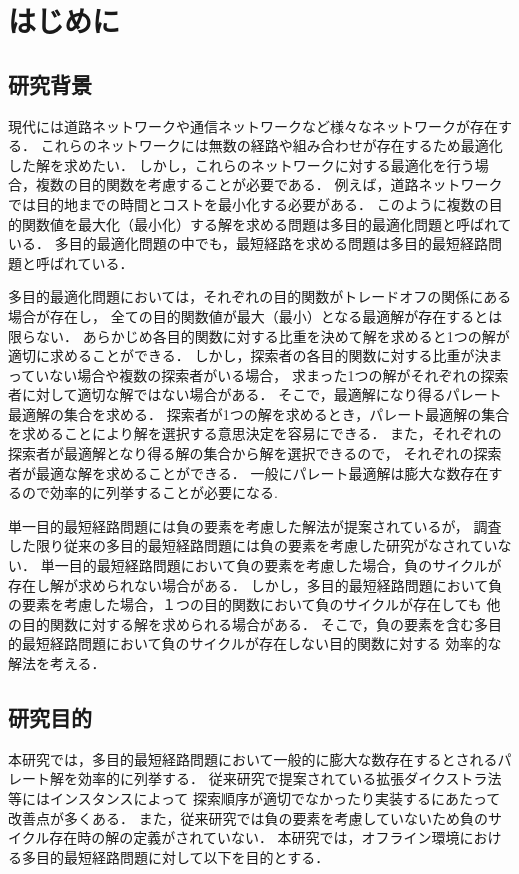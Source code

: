 \documentclass[12pt]{optlab-bachelor}
\begin{document}
\frontmatter %
\chapter{はじめに}
\section{研究背景}
現代には道路ネットワークや通信ネットワークなど様々なネットワークが存在する．
これらのネットワークには無数の経路や組み合わせが存在するため最適化した解を求めたい．
しかし，これらのネットワークに対する最適化を行う場合，複数の目的関数を考慮することが必要である．
例えば，道路ネットワークでは目的地までの時間とコストを最小化する必要がある．
このように複数の目的関数値を最大化（最小化）する解を求める問題は多目的最適化問題と呼ばれている．
多目的最適化問題の中でも，最短経路を求める問題は多目的最短経路問題と呼ばれている．

多目的最適化問題においては，それぞれの目的関数がトレードオフの関係にある場合が存在し，
全ての目的関数値が最大（最小）となる最適解が存在するとは限らない．
あらかじめ各目的関数に対する比重を決めて解を求めると1つの解が適切に求めることができる．
しかし，探索者の各目的関数に対する比重が決まっていない場合や複数の探索者がいる場合，
求まった1つの解がそれぞれの探索者に対して適切な解ではない場合がある．
そこで，最適解になり得るパレート最適解の集合を求める．
探索者が1つの解を求めるとき，パレート最適解の集合を求めることにより解を選択する意思決定を容易にできる．
また，それぞれの探索者が最適解となり得る解の集合から解を選択できるので，
それぞれの探索者が最適な解を求めることができる．
一般にパレート最適解は膨大な数存在するので効率的に列挙することが必要になる.

単一目的最短経路問題には負の要素を考慮した解法が提案されているが，
調査した限り従来の多目的最短経路問題には負の要素を考慮した研究がなされていない．
単一目的最短経路問題において負の要素を考慮した場合，負のサイクルが存在し解が求められない場合がある．
しかし，多目的最短経路問題において負の要素を考慮した場合，１つの目的関数において負のサイクルが存在しても
他の目的関数に対する解を求められる場合がある．
そこで，負の要素を含む多目的最短経路問題において負のサイクルが存在しない目的関数に対する
効率的な解法を考える．

\section{研究目的}
本研究では，多目的最短経路問題において一般的に膨大な数存在するとされるパレート解を効率的に列挙する．
従来研究で提案されている拡張ダイクストラ法等にはインスタンスによって
探索順序が適切でなかったり実装するにあたって改善点が多くある．
また，従来研究では負の要素を考慮していないため負のサイクル存在時の解の定義がされていない．
本研究では，オフライン環境における多目的最短経路問題に対して以下を目的とする．
\end{document}
